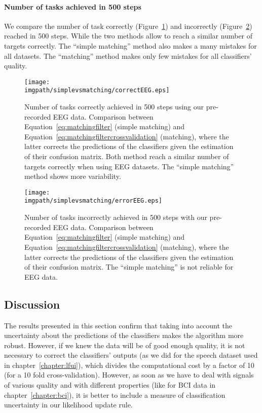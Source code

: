 \paragraph{Number of tasks achieved in 500 steps}

We compare the number of task correctly (Figure~\ref{fig:nCorrect_simplevsmatchingEEG}) and incorrectly (Figure~\ref{fig:nWrongEEG_simplevsmatchingEEG}) reached in 500 steps. While the two methods allow to reach a similar number of targets correctly. The ``simple matching'' method also makes a many mistakes for all datasets. The ``matching'' method makes only few mistakes for all classifiers' quality.

\newpage

\begin{figure}[!htbp]
\centering
\texttt{[image: \\imgpath/simplevsmatching/correctEEG.eps]}
\caption{Number of tasks correctly achieved in 500 steps using our pre-recorded EEG data. Comparison between Equation~\ref{eq:matchingfilter} (simple matching) and Equation~\ref{eq:matchingfiltercrossvalidation} (matching), where the latter corrects the predictions of the classifiers given the estimation of their confusion matrix. Both method reach a similar number of targets correctly when using EEG datasets. The ``simple matching''  method shows more variability.}
\label{fig:nCorrect_simplevsmatchingEEG}
\end{figure} 

\begin{figure}[!htbp]
\centering
\texttt{[image: \\imgpath/simplevsmatching/errorEEG.eps]}
\caption{Number of tasks incorrectly achieved in 500 steps with our pre-recorded EEG data. Comparison between Equation~\ref{eq:matchingfilter} (simple matching) and Equation~\ref{eq:matchingfiltercrossvalidation} (matching), where the latter corrects the predictions of the classifiers given the estimation of their confusion matrix. The ``simple matching'' is not reliable for EEG data.}
\label{fig:nWrongEEG_simplevsmatchingEEG}
\end{figure} 

\subsection{Discussion}

The results presented in this section confirm that taking into account the uncertainty about the predictions of the classifiers makes the algorithm more robust. However, if we knew the data will be of good enough quality, it is not necessary to correct the classifiers' outputs (as we did for the speech dataset used in chapter~\ref{chapter:lfui}), which divides the computational cost by a factor of 10 (for a 10 fold cross-validation). However, as soon as we have to deal with signals of various quality and with different properties (like for BCI data in chapter~\ref{chapter:bci}), it is better to include a measure of classification uncertainty in our likelihood update rule.